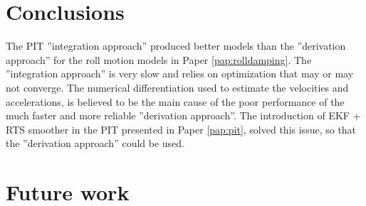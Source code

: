 \chapter{Conclusions\label{ch:conclusions}}
The PIT ''integration approach'' produced better models than the ''derivation approach'' for the roll motion models in Paper \ref{pap:rolldamping}. The ''integration approach'' is very slow and relies on optimization that may or may not converge.
The numerical differentiation used to estimate the velocities and accelerations, is believed to be the main cause of the poor performance of the much faster and more reliable ''derivation approach''. The introduction of EKF + RTS smoother in the PIT presented in Paper \ref{pap:pit}, solved this issue, so that the ''derivation approach'' could be used.  


\chapter{Future work\label{ch:future_work}}
